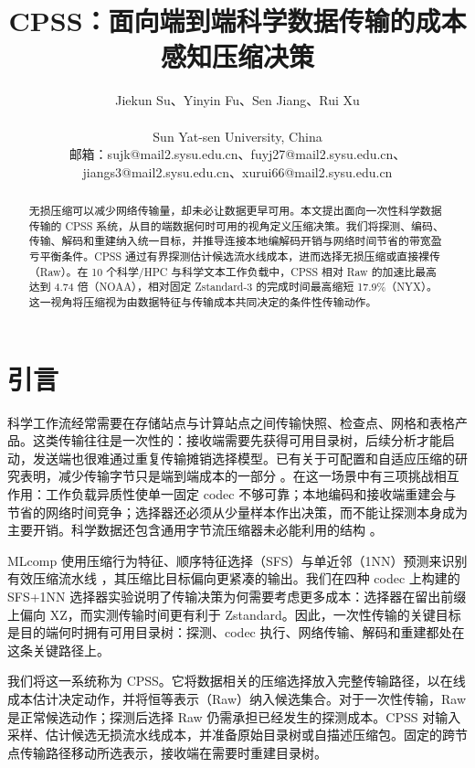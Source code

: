 \documentclass[smallabstract,smallcaptions]{dccpaper}
\renewcommand{\Section}[1]{\vspace*{-0.05in}\section{#1}\vspace{0.025in}}
\begin{document}
\title{\textbf{CPSS：面向端到端科学数据传输的成本感知压缩决策}}

\author{%
Jiekun Su、Yinyin Fu、Sen Jiang、Rui Xu\\[0.5em]
{\small\begin{minipage}{0.96\linewidth}\centering
Sun Yat-sen University, China\\
邮箱：sujk@mail2.sysu.edu.cn、fuyj27@mail2.sysu.edu.cn、jiangs3@mail2.sysu.edu.cn、xurui66@mail2.sysu.edu.cn
\end{minipage}}
}

\maketitle
\thispagestyle{empty}

\begin{abstract}
无损压缩可以减少网络传输量，却未必让数据更早可用。本文提出面向一次性科学数据传输的 CPSS 系统，从目的端数据何时可用的视角定义压缩决策。我们将探测、编码、传输、解码和重建纳入统一目标，并推导连接本地编解码开销与网络时间节省的带宽盈亏平衡条件。CPSS 通过有界探测估计候选流水线成本，进而选择无损压缩或直接裸传（Raw）。在 10 个科学/HPC 与科学文本工作负载中，CPSS 相对 Raw 的加速比最高达到 4.74 倍（NOAA），相对固定 Zstandard-3 的完成时间最高缩短 17.9\%（NYX）。这一视角将压缩视为由数据特征与传输成本共同决定的条件性传输动作。
\end{abstract}

\Section{引言}

科学工作流经常需要在存储站点与计算站点之间传输快照、检查点、网格和表格产品。这类传输往往是一次性的：接收端需要先获得可用目录树，后续分析才能启动，发送端也很难通过重复传输摊销选择模型。已有关于可配置和自适应压缩的研究表明，减少传输字节只是端到端成本的一部分 \cite{krintz2001,wiseman2004,knutsson1999}。在这一场景中有三项挑战相互作用：工作负载异质性使单一固定 codec 不够可靠；本地编码和接收端重建会与节省的网络时间竞争；选择器还必须从少量样本作出决策，而不能让探测本身成为主要开销。科学数据还包含通用字节流压缩器未必能利用的结构 \cite{burtscher2009,lindstrom2006,zfp2014}。

MLcomp 使用压缩行为特征、顺序特征选择（SFS）与单近邻（1NN）预测来识别有效压缩流水线 \cite{burtchell2024mlcomp}，其压缩比目标偏向更紧凑的输出。我们在四种 codec 上构建的 SFS+1NN 选择器实验说明了传输决策为何需要考虑更多成本：选择器在留出前缀上偏向 XZ，而实测传输时间更有利于 Zstandard。因此，一次性传输的关键目标是目的端何时拥有可用目录树：探测、codec 执行、网络传输、解码和重建都处在这条关键路径上。

我们将这一系统称为 CPSS。它将数据相关的压缩选择放入完整传输路径，以在线成本估计决定动作，并将恒等表示（Raw）纳入候选集合。对于一次性传输，Raw 是正常候选动作；探测后选择 Raw 仍需承担已经发生的探测成本。CPSS 对输入采样、估计候选无损流水线成本，并准备原始目录树或自描述压缩包。固定的跨节点传输路径移动所选表示，接收端在需要时重建目录树。
\end{document}
